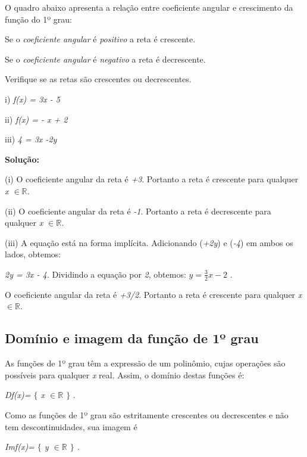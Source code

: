  O quadro abaixo apresenta a relação entre coeficiente angular e crescimento da função do 1º grau:

\begin{caixa}
Se o \textit{coeficiente angular} é \textit{positivo} a reta é crescente.

Se o \textit{coeficiente angular} é \textit{negativo }a reta é decrescente.
\end{caixa}

\begin{texemplo}
Verifique se as retas são crescentes ou decrescentes. 

i) \textit{f(x) = 3x - 5}

ii) \textit{f(x) = - x + 2}

iii) \textit{4 = 3x -2y}

\textbf{Solução:}

(i) O coeficiente angular da reta é \textit{+3}. Portanto a reta é crescente para qualquer \textit{x $ \in \mathbb{R}$.}

(ii)  O coeficiente angular da reta é \textit{-1}. Portanto a reta é decrescente para qualquer \textit{x $ \in \mathbb{R} $.}

(iii) A equação está na forma implícita. Adicionando (\textit{+2y}) e (\textit{-4}) em ambos os lados, obtemos:

\textit{\tab 2y = 3x - 4. }Dividindo a equação por \textit{2}, obtemos:   \( y=\frac{3}{2}x-2 \) . 

O coeficiente angular da reta é \textit{+3/2}. Portanto a reta é crescente para qualquer \textit{x $\in \mathbb{R}.$}\qedsymbol{}
\end{texemplo}

\subsection{Domínio e imagem da função de 1º grau}

\begin{caixa}
As funções de 1º grau têm a expressão de um polinômio, cujas operações são possíveis para qualquer \textit{x} real. Assim, o domínio destas funções é:

\textit{Df(x)= $ \{ $ x $ \in \mathbb{R} $ $ \} $ } .

Como as funções de 1º grau são estritamente crescentes ou decrescentes e não tem descontinuidades, sua imagem é

\textit{Imf(x)= $ \{ $ y $ \in \mathbb{R} $  $ \} $ .}
\end{caixa}

